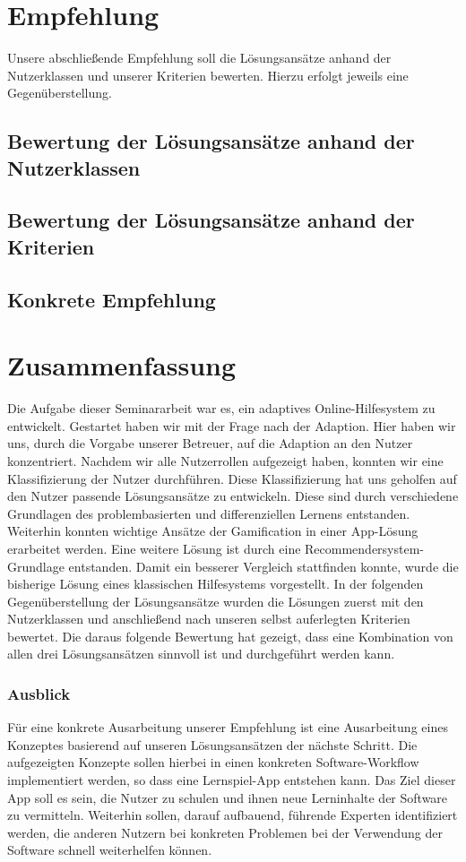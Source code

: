 \chapter{Empfehlung}
Unsere abschließende Empfehlung soll die Lösungsansätze anhand der Nutzerklassen und unserer Kriterien bewerten. Hierzu erfolgt jeweils eine Gegenüberstellung.
\section{Bewertung der Lösungsansätze anhand der Nutzerklassen}
\section{Bewertung der Lösungsansätze anhand der Kriterien}

\section{Konkrete Empfehlung}

\chapter{Zusammenfassung}
Die Aufgabe dieser Seminararbeit war es, ein adaptives Online-Hilfesystem zu entwickelt. Gestartet haben wir mit der Frage nach der Adaption. Hier haben wir uns, durch die Vorgabe unserer Betreuer, auf die Adaption an den Nutzer konzentriert. Nachdem wir alle Nutzerrollen aufgezeigt haben, konnten wir eine Klassifizierung der Nutzer durchführen. Diese Klassifizierung hat uns geholfen auf den Nutzer passende Lösungsansätze zu entwickeln. Diese sind durch verschiedene Grundlagen des problembasierten und differenziellen Lernens entstanden. Weiterhin konnten wichtige Ansätze der Gamification in einer App-Lösung erarbeitet werden. Eine weitere Lösung ist durch eine Recommendersystem-Grundlage entstanden. Damit ein besserer Vergleich stattfinden konnte, wurde die bisherige Lösung eines klassischen Hilfesystems vorgestellt. In der folgenden Gegenüberstellung der Lösungsansätze wurden die Lösungen zuerst mit den Nutzerklassen und anschließend nach unseren selbst auferlegten Kriterien bewertet. Die daraus folgende Bewertung hat gezeigt, dass eine Kombination von allen drei Lösungsansätzen sinnvoll ist und durchgeführt werden kann.

\subsection{Ausblick}
Für eine konkrete Ausarbeitung unserer Empfehlung ist eine Ausarbeitung eines Konzeptes basierend auf unseren Lösungsansätzen der nächste Schritt. Die aufgezeigten Konzepte sollen hierbei in einen konkreten Software-Workflow implementiert werden, so dass eine Lernspiel-App entstehen kann. Das Ziel dieser App soll es sein, die Nutzer zu schulen und ihnen neue Lerninhalte der Software zu vermitteln. Weiterhin sollen, darauf aufbauend, führende Experten identifiziert werden, die anderen Nutzern bei konkreten Problemen bei der Verwendung der Software schnell weiterhelfen können.


